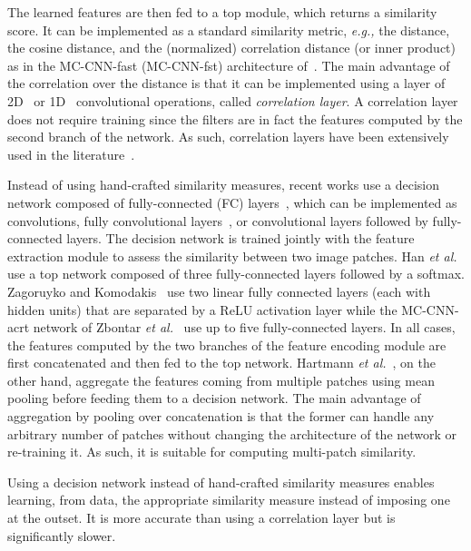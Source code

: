 \documentclass[10pt,journal,compsoc]{IEEEtran}
\newcommand{\eg}{\emph{e.g., }}
\newcommand{\etal}{\emph{et al.}}
\newcommand{\noi}{\noindent}
\begin{document}
\noi The learned features are then fed to a top module, which returns a similarity score. It can be implemented as a standard similarity metric, \eg the   distance, the cosine distance, and  the (normalized)  correlation distance (or inner product) as in the MC-CNN-fast (MC-CNN-fst) architecture of~\cite{zbontar2015computing,zbontar2016stereo}. The main advantage of the correlation  over the  distance is that it can be implemented using a layer of 2D~\cite{dosovitskiy2015flownet}  or 1D~\cite{mayer2016large} convolutional operations, called  \emph{correlation layer}.  A correlation layer does not require training since the filters are in fact the features computed by the second branch of the network.  As such, correlation layers have been extensively used in the literature~\cite{zbontar2015computing,simo2015discriminative,zbontar2016stereo,mayer2016large,luo2016efficient}. 

Instead of using hand-crafted similarity measures, recent works use a decision network composed of fully-connected (FC) layers~\cite{han2015matchnet,zagoruyko2015learning,zbontar2016stereo,shaked2017improved,ye2017efficient}, which can be implemented as  convolutions, fully convolutional layers~\cite{hartmann2017learned}, or convolutional layers followed by fully-connected layers. The decision network is trained jointly with the feature extraction module to assess the similarity between two image patches. Han \etal~\cite{han2015matchnet} use a top network composed of three fully-connected layers followed by a softmax.   Zagoruyko and Komodakis~\cite{zagoruyko2015learning}  use two linear fully connected layers (each with  hidden units) that are separated by a ReLU activation layer while the MC-CNN-acrt network of Zbontar \etal~\cite{zbontar2016stereo} use up to five fully-connected layers. In all cases, the features computed by the two branches of the feature encoding module are first concatenated and then fed to the top network. Hartmann \etal~\cite{hartmann2017learned}, on the other hand, aggregate the features coming from multiple patches using mean pooling before feeding them to a decision network. The main advantage of aggregation by pooling over concatenation is that the former can handle any arbitrary number of patches without changing the architecture of the network or re-training it. As such, it is suitable for computing multi-patch similarity.



Using a decision network instead of hand-crafted similarity measures  enables learning, from data, the appropriate similarity measure instead of imposing  one at the outset.  It is more accurate than using a correlation layer but is significantly slower. 
\end{document}

